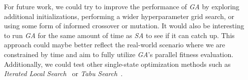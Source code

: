 For future work, we could try to improve the performance of \textit{GA} by exploring additional initializations, performing a wider hyperparameter grid search, or using some form of informed crossover or mutation. It would also be interesting to run \textit{GA} for the same amount of time as \textit{SA} to see if it can catch up. This approach could maybe better reflect the real-world scenario where we are constrained by time and aim to fully utilize \textit{GA}'s parallel fitness evaluation.
Additionally, we could test other single-state optimization methods such as \textit{Iterated Local Search}~\cite{lourenco2018iterated} or \textit{Tabu Search}~\cite{glover1998tabu}.
